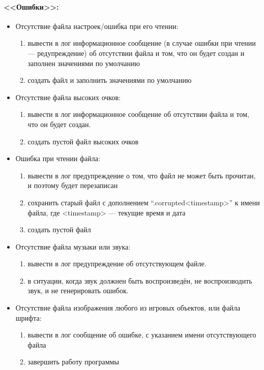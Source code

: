 \documentclass[12pt,a4paper,fullpage]{article}
\begin{document}
\paragraph{<<Ошибки>>:}
\begin{itemize}
	\item Отсутствие файла настроек/ошибка при его чтении:
	\begin{enumerate}
		\item вывести в лог информационное сообщение (в случае ошибки при чтении --- редупреждение) об отсутствии файла и том, что он будет создан и заполнен значениями по умолчанию
		\item создать файл и заполнить значениями по умолчанию
	\end{enumerate}
	\item Отсутствие файла высоких очков:
	\begin{enumerate}
		\item вывести в лог информационное сообщение об отсутствии файла и том, что он будет создан.
		\item создать пустой файл высоких очков
	\end{enumerate}
	\item Ошибка при чтении файла:
	\begin{enumerate}
		\item вывести в лог предупреждение о том, что файл не может быть прочитан, и поэтому будет перезаписан
		\item сохранить старый файл с дополнением ``.corrupted<timestamp>'' к имени файла, где <timestamp> --- текущие время и дата
		\item создать пустой файл
	\end{enumerate}
	\item Отсутствие файла музыки или звука:
	\begin{enumerate}
		\item вывести в лог предупреждение об отсутствующем файле.
		\item в ситуации, когда звук должнен быть воспроизведён, не воспроизводить звук, и не генерировать ошибок.
	\end{enumerate}
	\item Отсутствие файла изображения любого из игровых объектов, или файла шрифта:
	\begin{enumerate}
		\item вывести в лог сообщение об ошибке, с указанием имени отсутствующего файла
		\item завершить работу программы
	\end{enumerate}
\end{itemize}
\end{document}
